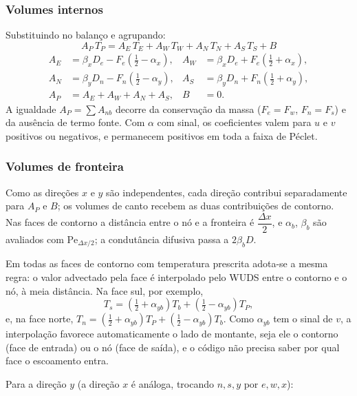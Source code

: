 \subsubsection*{Volumes internos}

Substituindo no balanço e agrupando:
\begin{equation}
  \boxed{\;A_P\,T_P=A_E\,T_E+A_W\,T_W+A_N\,T_N+A_S\,T_S+B\;}
\end{equation}
\[
\begin{aligned}
  A_E&=\beta_xD_e-F_e\left(\tfrac12-\alpha_x\right), &
  A_W&=\beta_xD_e+F_e\left(\tfrac12+\alpha_x\right),\\[4pt]
  A_N&=\beta_yD_n-F_n\left(\tfrac12-\alpha_y\right), &
  A_S&=\beta_yD_n+F_n\left(\tfrac12+\alpha_y\right),\\[4pt]
  A_P&=A_E+A_W+A_N+A_S, & B&=0 .
\end{aligned}
\]
A igualdade $A_P=\sum A_{nb}$ decorre da conservação da massa
($F_e=F_w$, $F_n=F_s$) e da ausência de termo fonte. Com $\alpha$ com sinal,
os coeficientes valem para $u$ e $v$ positivos ou negativos, e permanecem
positivos em toda a faixa de Péclet.

\subsubsection*{Volumes de fronteira}

Como as direções $x$ e $y$ são independentes, cada direção contribui
separadamente para $A_P$ e $B$; os volumes de canto recebem as duas
contribuições de contorno. Nas faces de contorno a distância entre o nó e a
fronteira é $\dfrac{\Delta x}{2}$, e $\alpha_b$, $\beta_b$ são avaliados com
${\mathrm{Pe}}_{\Delta x/2}$; a condutância difusiva passa a $2\beta_bD$.

Em todas as faces de contorno com temperatura prescrita adota-se a mesma
regra: o valor advectado pela face é interpolado pelo WUDS entre o contorno e
o nó, à meia distância. Na face sul, por exemplo,
\[
  T_s=\left(\tfrac12+\alpha_{yb}\right)T_b+\left(\tfrac12-\alpha_{yb}\right)T_P ,
\]
e, na face norte,
$T_n=\left(\tfrac12+\alpha_{yb}\right)T_P+\left(\tfrac12-\alpha_{yb}\right)T_b$.
Como $\alpha_{yb}$ tem o sinal de $v$, a interpolação favorece
automaticamente o lado de montante, seja ele o contorno (face de entrada) ou
o nó (face de saída), e o código não precisa saber por qual face o
escoamento entra.

Para a direção $y$ (a direção $x$ é análoga, trocando $n,s,y$ por $e,w,x$):

